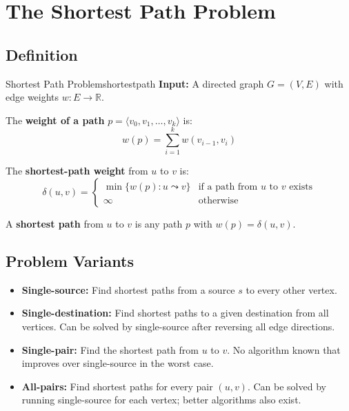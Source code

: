 \section*{The Shortest Path Problem}

\subsection{Definition}

\begin{definition}{Shortest Path Problem}{shortestpath}
\textbf{Input:} A directed graph $G = (V, E)$ with edge weights $w: E \to \mathbb{R}$.

The \textbf{weight of a path} $p = \langle v_0, v_1, \ldots, v_k \rangle$ is:
\[
  w(p) = \sum_{i=1}^{k} w(v_{i-1}, v_i)
\]

The \textbf{shortest-path weight} from $u$ to $v$ is:
\[
  \delta(u,v) = \begin{cases}
    \min\{w(p) : u \leadsto v\} & \text{if a path from } u \text{ to } v \text{ exists} \\
    \infty & \text{otherwise}
  \end{cases}
\]

A \textbf{shortest path} from $u$ to $v$ is any path $p$ with $w(p) = \delta(u,v)$.
\end{definition}

\subsection{Problem Variants}

\begin{itemize}[noitemsep]
  \item \textbf{Single-source:} Find shortest paths from a source $s$ to every other vertex.
  \item \textbf{Single-destination:} Find shortest paths to a given destination from all vertices.
        Can be solved by single-source after reversing all edge directions.
  \item \textbf{Single-pair:} Find the shortest path from $u$ to $v$.
        No algorithm known that improves over single-source in the worst case.
  \item \textbf{All-pairs:} Find shortest paths for every pair $(u,v)$.
        Can be solved by running single-source for each vertex; better algorithms also exist.
\end{itemize}

